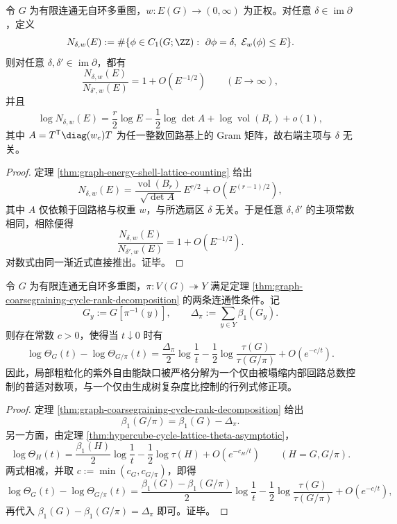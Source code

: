\begin{theorem}[固定散度扇区的微正则等熵律]\label{thm:conclusion-cyclelattice-fixed-divergence-equientropy}
令 \(G\) 为有限连通无自环多重图，\(w:E(G)\to(0,\infty)\) 为正权。对任意 \(\delta\in\operatorname{im}\partial\)，定义
\[
N_{\delta,w}(E)
:=
\#\{\phi\in C_1(G;\ZZ):\ \partial\phi=\delta,\ \mathcal E_w(\phi)\le E\}.
\]
则对任意 \(\delta,\delta'\in\operatorname{im}\partial\)，都有
\[
\frac{N_{\delta,w}(E)}{N_{\delta',w}(E)}
=
1+O(E^{-1/2})
\qquad(E\to\infty),
\]
并且
\[
\log N_{\delta,w}(E)
=
\frac r2\log E-\frac12\log\det A+\log\operatorname{vol}(B_r)+o(1),
\]
其中 \(A=T^{\mathsf T}\diag(w_e)T\) 为任一整数回路基上的 Gram 矩阵，故右端主项与 \(\delta\) 无关。
\end{theorem}
\begin{proof}
定理 \ref{thm:graph-energy-shell-lattice-counting} 给出
\[
N_{\delta,w}(E)
=
\frac{\operatorname{vol}(B_r)}{\sqrt{\det A}}\,E^{r/2}
+O\!\left(E^{(r-1)/2}\right),
\]
其中 \(A\) 仅依赖于回路格与权重 \(w\)，与所选扇区 \(\delta\) 无关。于是任意 \(\delta,\delta'\) 的主项常数相同，相除便得
\[
\frac{N_{\delta,w}(E)}{N_{\delta',w}(E)}
=
1+O(E^{-1/2}).
\]
对数式由同一渐近式直接推出。证毕。
\end{proof}

\begin{theorem}[局部粗粒化的紫外自由能缺口分解]\label{thm:conclusion-cyclelattice-coarsegraining-uv-gap}
令 \(G\) 为有限连通无自环多重图，\(\pi:V(G)\twoheadrightarrow Y\) 满足定理 \ref{thm:graph-coarsegraining-cycle-rank-decomposition} 的两条连通性条件。记
\[
G_y:=G[\pi^{-1}(y)],
\qquad
\Delta_\pi:=\sum_{y\in Y}\beta_1(G_y).
\]
则存在常数 \(c>0\)，使得当 \(t\downarrow 0\) 时有
\[
\log \Theta_G(t)-\log \Theta_{G/\pi}(t)
=
\frac{\Delta_\pi}{2}\log\frac1t
-\frac12\log\frac{\tau(G)}{\tau(G/\pi)}
+O(e^{-c/t}).
\]
因此，局部粗粒化的紫外自由能缺口被严格分解为一个仅由被塌缩内部回路总数控制的普适对数项，与一个仅由生成树复杂度比控制的行列式修正项。
\end{theorem}
\begin{proof}
定理 \ref{thm:graph-coarsegraining-cycle-rank-decomposition} 给出
\[
\beta_1(G/\pi)=\beta_1(G)-\Delta_\pi.
\]
另一方面，由定理 \ref{thm:hypercube-cycle-lattice-theta-asymptotic}，
\[
\log\Theta_H(t)
=
\frac{\beta_1(H)}2\log\frac1t-\frac12\log\tau(H)+O(e^{-c_H/t})
\qquad (H=G,G/\pi).
\]
两式相减，并取 \(c:=\min(c_G,c_{G/\pi})\)，即得
\[
\log \Theta_G(t)-\log \Theta_{G/\pi}(t)
=
\frac{\beta_1(G)-\beta_1(G/\pi)}2\log\frac1t
-\frac12\log\frac{\tau(G)}{\tau(G/\pi)}
+O(e^{-c/t}),
\]
再代入 \(\beta_1(G)-\beta_1(G/\pi)=\Delta_\pi\) 即可。证毕。
\end{proof}

